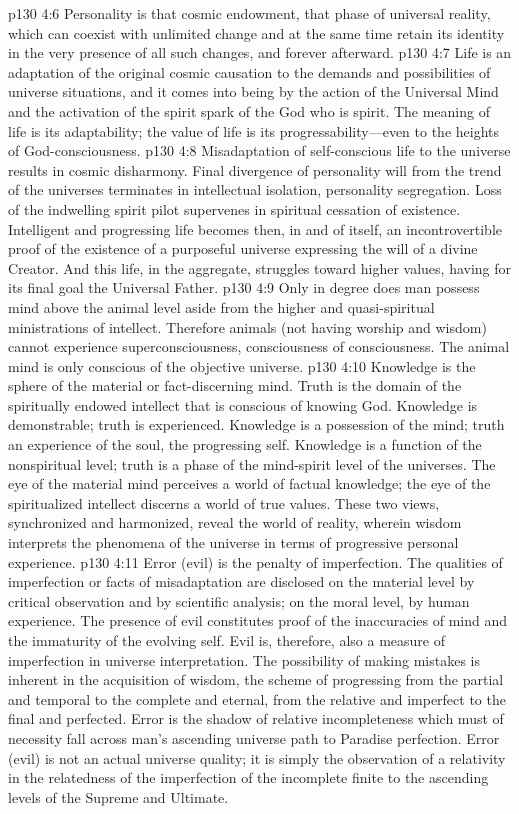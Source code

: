 \vs p130 4:6 Personality is that cosmic endowment, that phase of universal reality, which can coexist with unlimited change and at the same time retain its identity in the very presence of all such changes, and forever afterward.
\vs p130 4:7 Life is an adaptation of the original cosmic causation to the demands and possibilities of universe situations, and it comes into being by the action of the Universal Mind and the activation of the spirit spark of the God who is spirit. The meaning of life is its adaptability; the value of life is its progressability---even to the heights of God\hyp{}consciousness.
\vs p130 4:8 Misadaptation of self\hyp{}conscious life to the universe results in cosmic disharmony. Final divergence of personality will from the trend of the universes terminates in intellectual isolation, personality segregation. Loss of the indwelling spirit pilot supervenes in spiritual cessation of existence. Intelligent and progressing life becomes then, in and of itself, an incontrovertible proof of the existence of a purposeful universe expressing the will of a divine Creator. And this life, in the aggregate, struggles toward higher values, having for its final goal the Universal Father.
\vs p130 4:9 Only in degree does man possess mind above the animal level aside from the higher and quasi\hyp{}spiritual ministrations of intellect. Therefore animals (not having worship and wisdom) cannot experience superconsciousness, consciousness of consciousness. The animal mind is only conscious of the objective universe.
\vs p130 4:10 Knowledge is the sphere of the material or fact\hyp{}discerning mind. Truth is the domain of the spiritually endowed intellect that is conscious of knowing God. Knowledge is demonstrable; truth is experienced. Knowledge is a possession of the mind; truth an experience of the soul, the progressing self. Knowledge is a function of the nonspiritual level; truth is a phase of the mind\hyp{}spirit level of the universes. The eye of the material mind perceives a world of factual knowledge; the eye of the spiritualized intellect discerns a world of true values. These two views, synchronized and harmonized, reveal the world of reality, wherein wisdom interprets the phenomena of the universe in terms of progressive personal experience.
\vs p130 4:11 Error (evil) is the penalty of imperfection. The qualities of imperfection or facts of misadaptation are disclosed on the material level by critical observation and by scientific analysis; on the moral level, by human experience. The presence of evil constitutes proof of the inaccuracies of mind and the immaturity of the evolving self. Evil is, therefore, also a measure of imperfection in universe interpretation. The possibility of making mistakes is inherent in the acquisition of wisdom, the scheme of progressing from the partial and temporal to the complete and eternal, from the relative and imperfect to the final and perfected. Error is the shadow of relative incompleteness which must of necessity fall across man’s ascending universe path to Paradise perfection. Error (evil) is not an actual universe quality; it is simply the observation of a relativity in the relatedness of the imperfection of the incomplete finite to the ascending levels of the Supreme and Ultimate.\plusone
